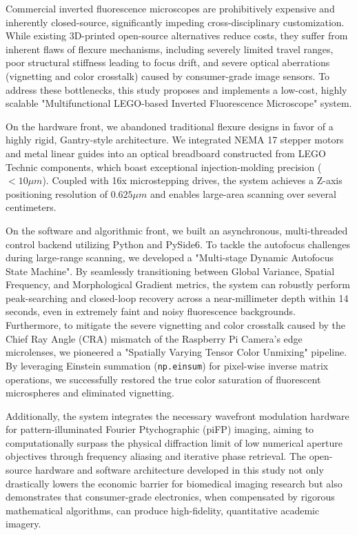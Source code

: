 \begin{abstract*}

Commercial inverted fluorescence microscopes are prohibitively expensive and inherently closed-source, significantly impeding cross-disciplinary customization. While existing 3D-printed open-source alternatives reduce costs, they suffer from inherent flaws of flexure mechanisms, including severely limited travel ranges, poor structural stiffness leading to focus drift, and severe optical aberrations (vignetting and color crosstalk) caused by consumer-grade image sensors. To address these bottlenecks, this study proposes and implements a low-cost, highly scalable "Multifunctional LEGO-based Inverted Fluorescence Microscope" system.

On the hardware front, we abandoned traditional flexure designs in favor of a highly rigid, Gantry-style architecture. We integrated NEMA 17 stepper motors and metal linear guides into an optical breadboard constructed from LEGO Technic components, which boast exceptional injection-molding precision ($<10 \mu m$). Coupled with 16x microstepping drives, the system achieves a Z-axis positioning resolution of $0.625 \mu m$ and enables large-area scanning over several centimeters.

On the software and algorithmic front, we built an asynchronous, multi-threaded control backend utilizing Python and PySide6. To tackle the autofocus challenges during large-range scanning, we developed a "Multi-stage Dynamic Autofocus State Machine". By seamlessly transitioning between Global Variance, Spatial Frequency, and Morphological Gradient metrics, the system can robustly perform peak-searching and closed-loop recovery across a near-millimeter depth within 14 seconds, even in extremely faint and noisy fluorescence backgrounds. Furthermore, to mitigate the severe vignetting and color crosstalk caused by the Chief Ray Angle (CRA) mismatch of the Raspberry Pi Camera's edge microlenses, we pioneered a "Spatially Varying Tensor Color Unmixing" pipeline. By leveraging Einstein summation (\texttt{np.einsum}) for pixel-wise inverse matrix operations, we successfully restored the true color saturation of fluorescent microspheres and eliminated vignetting.

Additionally, the system integrates the necessary wavefront modulation hardware for pattern-illuminated Fourier Ptychographic (piFP) imaging, aiming to computationally surpass the physical diffraction limit of low numerical aperture objectives through frequency aliasing and iterative phase retrieval. The open-source hardware and software architecture developed in this study not only drastically lowers the economic barrier for biomedical imaging research but also demonstrates that consumer-grade electronics, when compensated by rigorous mathematical algorithms, can produce high-fidelity, quantitative academic imagery.

\end{abstract*}